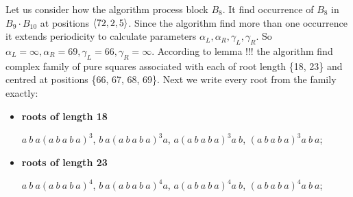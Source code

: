 ﻿\documentclass[11pt]{article}
\begin{document}
\begin{appendix}
\ComplexExamplePartititon

Let us consider how the algorithm process block $B_8$. It find occurrence of $B_8$ in $B_9 \cdot B_{10}$ at positions
$\langle 72, 2, 5\rangle$. Since the algorithm find more than one occurrence it extends periodicity to calculate parameters
$\alpha_L, \alpha_R, \gamma_L, \gamma_R$. So $\alpha_L = \infty, \alpha_R = 69, \gamma_L = 66, \gamma_R = \infty$.
According to lemma !!! the algorithm find complex family of pure squares associated with each of root length \{18, 23\} 
and centred at positions \{66, 67, 68, 69\}. Next we write every root from the family exactly: 

\begin{itemize}
  \item \textbf{roots of length 18}

  $a~b~a(a~b~a~b~a)^3$, $b~a(a~b~a~b~a)^3a$, $a(a~b~a~b~a)^3a~b$, $(a~b~a~b~a)^3a~b~a$;
  \item \textbf{roots of length 23}
  
  $a~b~a(a~b~a~b~a)^4$, $b~a(a~b~a~b~a)^4a$, $a(a~b~a~b~a)^4a~b$, $(a~b~a~b~a)^4a~b~a$;
\end{itemize}

\end{appendix}
\end{document}
